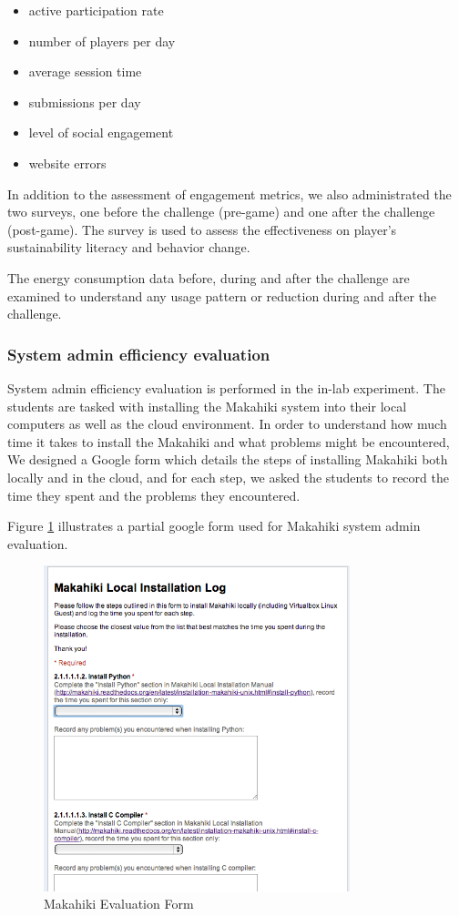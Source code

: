\documentclass{sigchi}
\begin{document}
\begin{itemize}
\item active participation rate
\item number of players per day
\item average session time
\item submissions per day
\item level of social engagement
\item website errors
\end{itemize}

In addition to the assessment of engagement metrics, we also administrated the two surveys, one before the challenge (pre-game) and one after the challenge (post-game). The survey is used to assess the effectiveness on player's sustainability literacy and behavior change.

The energy consumption data before, during and after the challenge are examined to understand any usage pattern or reduction during and after the challenge.

\subsubsection{System admin efficiency evaluation}

System admin efficiency evaluation is performed in the in-lab experiment. The students are tasked with installing the Makahiki system into their local computers as well as the cloud environment. In order to understand how much time it takes to install the Makahiki and what problems might be encountered, We designed a Google form which details the steps of installing Makahiki both locally and in the cloud, and for each step, we asked the students to record the time they spent and the problems they encountered.

Figure \ref{fig:makahiki-eval-form} illustrates a partial google form used for Makahiki system admin evaluation.

\begin{figure}[ht!]
   \centering
   \includegraphics[width=3.5in]{developer-eval-form}
   \caption{Makahiki Evaluation Form}
   \label{fig:makahiki-eval-form}
\end{figure}
\end{document}
